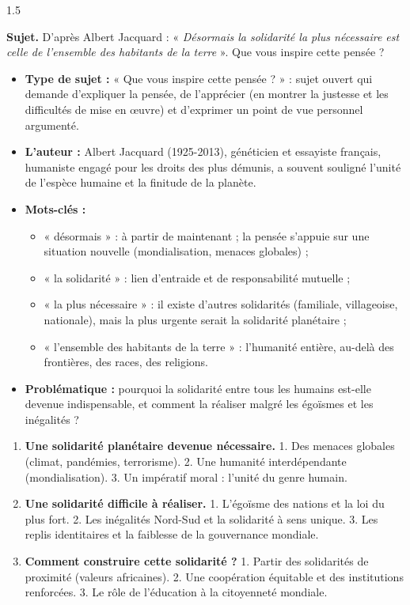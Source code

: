 \documentclass[12pt]{article}
\begin{document}
\begin{spacing}{1.5}

\noindent\textbf{Sujet.} D'après Albert Jacquard : « \emph{Désormais la solidarité la plus nécessaire est celle de l'ensemble des habitants de la terre} ». Que vous inspire cette pensée ?


\begin{itemize}
\item \textbf{Type de sujet :} « Que vous inspire cette pensée ? » : sujet ouvert qui demande d'expliquer la pensée, de l'apprécier (en montrer la justesse et les difficultés de mise en œuvre) et d'exprimer un point de vue personnel argumenté.
\item \textbf{L'auteur :} Albert Jacquard (1925-2013), généticien et essayiste français, humaniste engagé pour les droits des plus démunis, a souvent souligné l'unité de l'espèce humaine et la finitude de la planète.
\item \textbf{Mots-clés :}
  \begin{itemize}
  \item « désormais » : à partir de maintenant ; la pensée s'appuie sur une situation nouvelle (mondialisation, menaces globales) ;
  \item « la solidarité » : lien d'entraide et de responsabilité mutuelle ;
  \item « la plus nécessaire » : il existe d'autres solidarités (familiale, villageoise, nationale), mais la plus urgente serait la solidarité planétaire ;
  \item « l'ensemble des habitants de la terre » : l'humanité entière, au-delà des frontières, des races, des religions.
  \end{itemize}
\item \textbf{Problématique :} pourquoi la solidarité entre tous les humains est-elle devenue indispensable, et comment la réaliser malgré les égoïsmes et les inégalités ?
\end{itemize}


\begin{enumerate}
\item[I.] \textbf{Une solidarité planétaire devenue nécessaire.} 1. Des menaces globales (climat, pandémies, terrorisme). 2. Une humanité interdépendante (mondialisation). 3. Un impératif moral : l'unité du genre humain.
\item[II.] \textbf{Une solidarité difficile à réaliser.} 1. L'égoïsme des nations et la loi du plus fort. 2. Les inégalités Nord-Sud et la solidarité à sens unique. 3. Les replis identitaires et la faiblesse de la gouvernance mondiale.
\item[III.] \textbf{Comment construire cette solidarité ?} 1. Partir des solidarités de proximité (valeurs africaines). 2. Une coopération équitable et des institutions renforcées. 3. Le rôle de l'éducation à la citoyenneté mondiale.
\end{enumerate}


\end{spacing}
\end{document}
